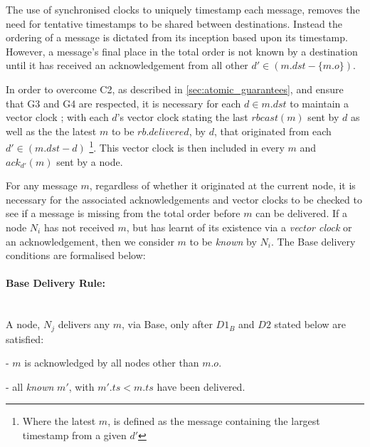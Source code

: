     The use of synchronised clocks to uniquely timestamp each message, removes the need for tentative timestamps to be shared between destinations.  Instead the ordering of a message is dictated from its inception based upon its timestamp.  However,  a message's final place in the total order is not known by a destination until it has received an acknowledgement from all other $d' \in (m.dst - \{m.o\})$.  
    
    In order to overcome C2, as described in \ref{sec:atomic_guarantees}, and ensure that G3 and G4 are respected, it is necessary for each $d \in m.dst$ to maintain a vector clock \citep{Mattern88virtualtime, fidge1988timestamps}; with each $d$'s vector clock stating the last $rbcast(m)$ sent by $d$ as well as the the latest $m$ to be $rb.delivered$, by $d$, that originated from each $d' \in (m.dst - d)$ \footnote{Where the latest $m$, is defined as the message containing the largest timestamp from a given $d'$}.  This vector clock is then included in every $m$ and $ack_{d'}(m)$ sent by a node.  
    
    For any message $m$, regardless of whether it originated at the current node, it is necessary for the associated acknowledgements and vector clocks to be checked to see if a message is missing from the total order before $m$ can be delivered.  If a node $N_i$ has not received $m$, but has learnt of its existence via a \emph{vector clock} or an acknowledgement, then we consider $m$ to be \emph{known} by $N_i$.  The \textsf{Base} delivery conditions are formalised below:
    
    \paragraph{\textsf{Base} Delivery Rule:}\hspace{0pt} \\
        A node, $N_j$ delivers any $m$, via \textsf{Base}, only after $D1_B$ and $D2$ stated below are satisfied:
        \begin{description}[labelindent=1cm]
            \item[$\boldsymbol{D1_B}$] - $m$ is acknowledged by all nodes other than $m.o$. 
            \item[$\boldsymbol{D2}$] - all \emph{known} $m'$, with $m'.ts < m.ts$ have been delivered.
        \end{description}
    
